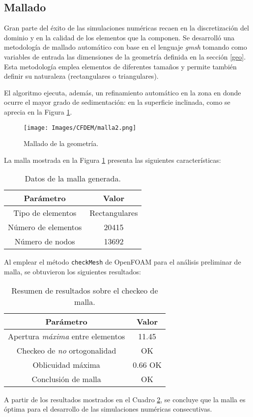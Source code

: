 \subsection{Mallado}

\noindent
\justify

Gran parte del \'exito de las simulaciones num\'ericas recaen en la discretizaci\'on del dominio y en la calidad de los elementos que la componen. Se desarroll\'o una metodolog\'ia de mallado autom\'atico con base en el lenguaje \textit{gmsh} tomando como variables de entrada las dimensiones de la geometr\'ia definida en la secci\'on \ref{geo}. Esta metodolog\'ia emplea elementos de diferentes tama\~nos y permite tambi\'en definir su naturaleza (rectangulares o triangulares).

\noindent
\justify

El algoritmo ejecuta, adem\'as, un refinamiento autom\'atico en la zona en donde ocurre el mayor grado de sedimentaci\'on: en la superficie inclinada, como se aprecia en la Figura \ref{malla:geo}.

\begin{figure}[h!]
	\centering
	\texttt{[image: Images/CFDEM/malla2.png]}
	\caption{Mallado de la geometr\'ia.}
	\label{malla:geo}
\end{figure}

\newpage

\noindent
\justify

La malla mostrada en la Figura \ref{malla:geo} presenta las siguientes caracter\'isticas:

\begin{table}[h!]
	\centering
	\begin{tabular}{|c|c|}
		\hline
		\textbf{Par\'ametro} & \textbf{Valor} \\ \hline
		Tipo de elementos & Rectangulares \\ \hline
		N\'umero de elementos & 20415 \\ \hline
		N\'umero de nodos & 13692 \\ \hline	
	\end{tabular}
	\caption{Datos de la malla generada.}
	\label{malla}
\end{table}

\noindent
\justify

Al emplear el m\'etodo \texttt{checkMesh} de OpenFOAM para el an\'alisis preliminar de malla, se obtuvieron los siguientes resultados:

\begin{table}[h!]
	\centering
	\begin{tabular}{|c|c|}
		\hline
		\textbf{Par\'ametro} & \textbf{Valor} \\ \hline
		Apertura \textit{m\'axima} entre elementos & 11.45 \\ \hline
		Checkeo de \textit{no} ortogonalidad & OK \\ \hline
		Oblicuidad m\'axima & 0.66 OK \\ \hline
		Conclusi\'on de malla & OK \\ \hline
	\end{tabular}
	\caption{Resumen de resultados sobre el checkeo de malla.}
	\label{check}
\end{table}

\noindent
\justify

A partir de los resultados mostrados en el Cuadro \ref{check}, se concluye que la malla es \'optima para el desarrollo de las simulaciones num\'ericas consecutivas.